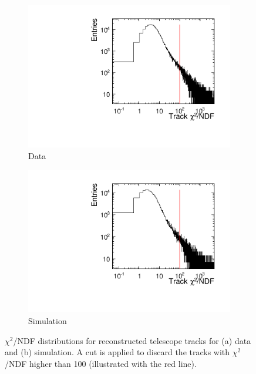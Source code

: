 \begin{figure}[htbp] \centering
  \begin{subfigure}[b]{0.45\textwidth}
    \includegraphics[width=\textwidth]{figures/Telescope/biasedResiduals/chi2_run661.pdf}
    \caption{Data}
  \end{subfigure}\hfill
  \begin{subfigure}[b]{0.45\textwidth}
    \includegraphics[width=\textwidth]{figures/Telescope/biasedResiduals/chi2_run77.pdf}
    \caption{Simulation}
  \end{subfigure}
  \caption{$\chi^2$/NDF distributions for reconstructed telescope
    tracks for (a) data and (b) simulation. A cut is applied to
    discard the tracks with $\chi^2$/NDF higher than 100 (illustrated
    with the red line).}
  \label{fig:chi2_data_simu}
\end{figure}

